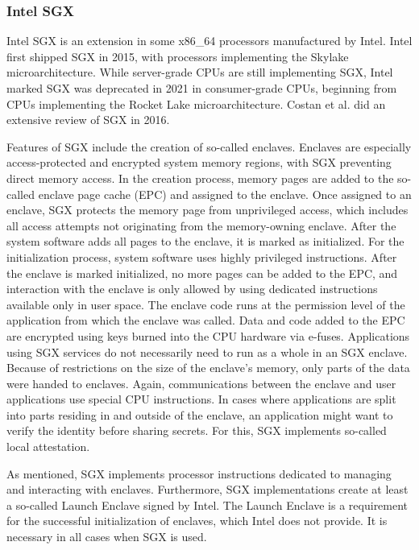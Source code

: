 \subsubsection{Intel SGX}
\label{sec:20:sgx}
Intel SGX is an extension in some x86\_64 processors manufactured by Intel. Intel first shipped SGX in 2015, with
processors implementing the Skylake microarchitecture. While server-grade CPUs are still implementing SGX, Intel marked
SGX was deprecated in 2021 in consumer-grade CPUs, beginning from CPUs implementing the Rocket Lake microarchitecture.
Costan et al. did an extensive review of SGX in 2016.\cite{costan2016intel}

Features of SGX include the creation of so-called enclaves. Enclaves are especially access-protected and encrypted
system memory regions, with SGX preventing direct memory access. In the creation process, memory pages are
added to the so-called enclave page cache (EPC) and assigned to the enclave. Once assigned to an enclave, SGX protects
the memory page from unprivileged access, which includes all access attempts not originating from the memory-owning
enclave. After the system software adds all pages to the enclave, it is marked as initialized. For the initialization
process, system software uses highly privileged instructions. After the enclave is marked initialized, no more pages
can be added to the EPC, and interaction with the
enclave is only allowed by using dedicated instructions available only in user space. The enclave code runs at the
permission level of the application from which the enclave was called. Data and code added to the EPC are encrypted
using keys burned into the CPU hardware via e-fuses. Applications using SGX services do not necessarily need to run as a
whole in an SGX enclave. Because of restrictions on the size of the enclave's memory, only parts of the data were handed
to enclaves. Again, communications between the enclave and user applications use special CPU instructions. In cases where
applications are split into parts residing in and outside of the enclave, an application might want to verify the identity
before sharing secrets. For this, SGX implements so-called local attestation.

As mentioned, SGX implements processor instructions dedicated to managing and interacting with enclaves. Furthermore,
SGX implementations create at least a so-called Launch Enclave signed by Intel. The Launch Enclave is a
requirement for the successful initialization of enclaves, which Intel does not provide. It is necessary in all cases when SGX
is used.

